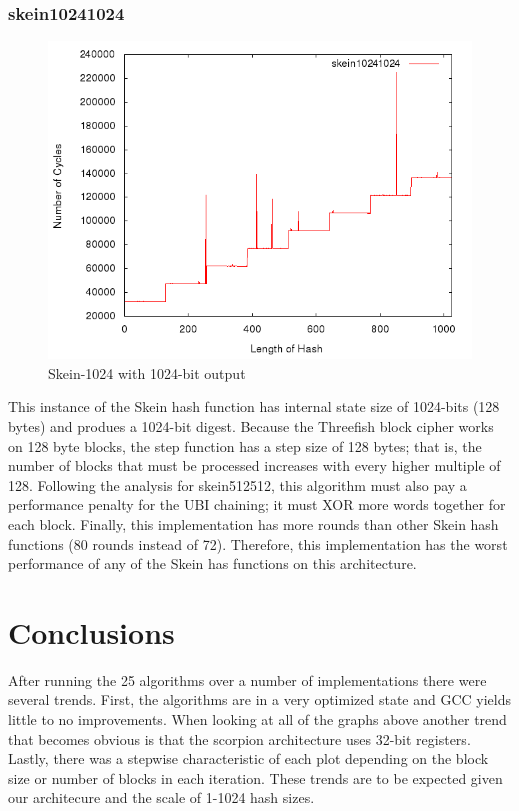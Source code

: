 \documentclass[10pt,a4paper]{article}
\begin{document}
\subsubsection{skein10241024}
    \begin{figure}[H]
        \begin{center}
            \includegraphics[scale=0.5]{images/skein10241024.png} 
            \caption{Skein-1024 with 1024-bit output}
        \end{center}
    \end{figure}

This instance of the Skein hash function has internal state size of 1024-bits (128 bytes) and produes a 1024-bit digest.  Because the Threefish block cipher works on 128 byte blocks, the step function has a step size of 128 bytes; that is, the number of blocks that must be processed increases with every higher multiple of 128.  Following the analysis for skein512512, this algorithm must also pay a performance penalty for the UBI chaining; it must XOR more words together for each block.  Finally, this implementation has more rounds than other Skein hash functions (80 rounds instead of 72).  Therefore, this implementation has the worst performance of any of the Skein has functions on this architecture.

\section*{Conclusions}
After running the 25 algorithms over a number of implementations there were several trends. First, the algorithms are in a very optimized state and 
GCC yields little to no improvements. When looking at all of the graphs above another trend that becomes obvious is that the scorpion architecture uses 
32-bit registers. Lastly, there was a stepwise characteristic of each plot depending on the block size or number of blocks in each iteration. These trends
are to be expected given our architecure and the scale of 1-1024 hash sizes.

{}

\end{document}
